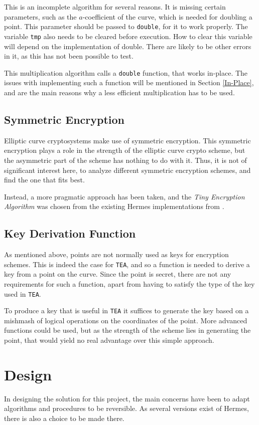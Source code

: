 This is an incomplete algorithm for several reasons. It is missing certain parameters, such as the $a$-coefficient of the curve, which is needed for doubling a point. This parameter should be passed to \texttt{double}, for it to work properly. The variable \texttt{tmp} also needs to be cleared before execution. How to clear this variable will depend on the implementation of double. There are likely to be other errors in it, as this has not been possible to test.

This multiplication algorithm calls a \texttt{double} function, that works in-place. The issues with implementing such a function will be mentioned in Section \ref{In-Place}, and are the main reasons why a less efficient multiplication has to be used. 
\newpage
\subsection{Symmetric Encryption}
Elliptic curve cryptosystems make use of symmetric encryption. This symmetric encryption plays a role in the strength of the elliptic curve crypto scheme, but the asymmetric part of the scheme has nothing to do with it. Thus, it is not of significant interest here, to analyze different symmetric encryption schemes, and find the one that fits best.

Instead, a more pragmatic approach has been taken, and the \textit{Tiny Encryption Algorithm} was chosen from the existing Hermes implementations from \cite{PSI19}. 
\subsection{Key Derivation Function}
As mentioned above, points are not normally used as keys for encryption schemes. This is indeed the case for \texttt{TEA}, and so a function is needed to derive a key from a point on the curve. Since the point is secret, there are not any requirements for such a function, apart from having to satisfy the type of the key used in \texttt{TEA}.

To produce a key that is useful in \texttt{TEA} it suffices to generate the key based on a mishmash of logical operations on the coordinates of the point. More advanced functions could be used, but as the strength of the scheme lies in generating the point, that would yield no real advantage over this simple approach. 
\section{Design}
\label{ellipticDesign}
In designing the solution for this project, the main concerns have been to adapt algorithms and procedures to be reversible. As several versions exist of Hermes, there is also a choice to be made there.

